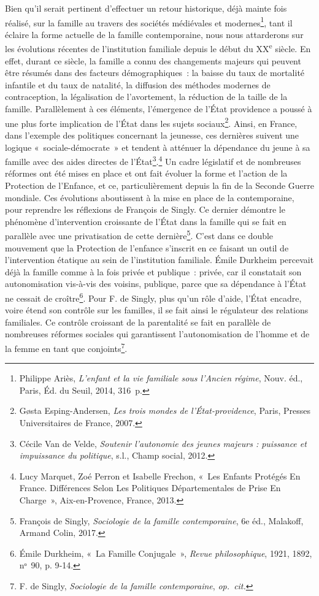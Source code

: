 \documentclass[
  12,
  a4paper,
]{report}
\begin{document}
Bien qu'il serait pertinent d'effectuer un retour historique, déjà
mainte fois réalisé, sur la famille au travers des sociétés médiévales
et modernes\footnote{Philippe Ariès, \emph{L'enfant et la vie familiale
  sous l'Ancien régime}, Nouv. éd., {Paris}, {Éd. du Seuil}, 2014,
  316~p.}, tant il éclaire la forme actuelle de la famille
contemporaine, nous nous attarderons sur les évolutions récentes de
l'institution familiale depuis le début du XX\textsuperscript{e} siècle.
En effet, durant ce siècle, la famille a connu des changements majeurs
qui peuvent être résumés dans des facteurs démographiques~: la baisse du
taux de mortalité infantile et du taux de natalité, la diffusion des
méthodes modernes de contraception, la légalisation de l'avortement, la
réduction de la taille de la famille. Parallèlement à ces éléments,
l'émergence de l'État providence a poussé à une plus forte implication
de l'État dans les sujets sociaux\footnote{Gøsta Esping-Andersen,
  \emph{Les trois mondes de l'État-providence}, {Paris}, {Presses
  Universitaires de France}, 2007.}. Ainsi, en France, dans l'exemple
des politiques concernant la jeunesse, ces dernières suivent une logique
«~sociale-démocrate~» et tendent à atténuer la dépendance du jeune à sa
famille avec des aides directes de l'État\footnote{Cécile Van de Velde,
  \emph{Soutenir l'autonomie des jeunes majeurs : puissance et
  impuissance du politique}, s.l., {Champ social}, 2012.}.\footnote{Lucy
  Marquet, Zoé Perron et Isabelle Frechon, {«~Les Enfants Protégés En
  {France}. {Différences} Selon Les Politiques Départementales de Prise
  En Charge~»}, {Aix-en-Provence, France}, 2013.} Un cadre législatif et
de nombreuses réformes ont été mises en place et ont fait évoluer la
forme et l'action de la Protection de l'Enfance, et ce, particulièrement
depuis la fin de la Seconde Guerre mondiale. Ces évolutions aboutissent
à la mise en place de la contemporaine, pour reprendre les réflexions de
François de Singly. Ce dernier démontre le phénomène d'intervention
croissante de l'État dans la famille qui se fait en parallèle avec une
privatisation de cette dernière\footnote{François de Singly,
  \emph{Sociologie de la famille contemporaine}, 6e éd., {Malakoff},
  {Armand Colin}, 2017.}. C'est dans ce double mouvement que la
Protection de l'enfance s'inscrit en ce faisant un outil de
l'intervention étatique au sein de l'institution familiale. Émile
Durkheim percevait déjà la famille comme à la fois privée et publique~:
privée, car il constatait son autonomisation vis-à-vis des voisins,
publique, parce que sa dépendance à l'État ne cessait de
croître\footnote{Émile Durkheim, {«~La Famille Conjugale~»}, \emph{Revue
  philosophique}, 1921, 1892, nᵒ~90, p. 9‑14.}. Pour F. de Singly, plus
qu'un rôle d'aide, l'État encadre, voire étend son contrôle sur les
familles, il se fait ainsi le régulateur des relations familiales. Ce
contrôle croissant de la parentalité se fait en parallèle de nombreuses
réformes sociales qui garantissent l'autonomisation de l'homme et de la
femme en tant que conjoints\footnote{F. de Singly, \emph{Sociologie de
  la famille contemporaine}, \emph{op.~cit.}}.
\end{document}
